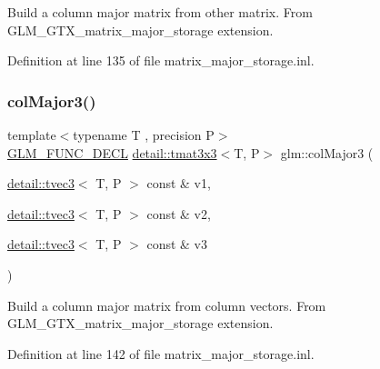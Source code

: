 Build a column major matrix from other matrix. From G\+L\+M\+\_\+\+G\+T\+X\+\_\+matrix\+\_\+major\+\_\+storage extension. 

Definition at line 135 of file matrix\+\_\+major\+\_\+storage.\+inl.

\mbox{\label{group__gtx__matrix__major__storage_ga8bc9dc6fcd7017b7123a151d9f251013}} 
\subsubsection{\texorpdfstring{col\+Major3()}{colMajor3()}\hspace{0.1cm}{\footnotesize\ttfamily [1/2]}}
{\footnotesize\ttfamily template$<$typename T , precision P$>$ \\
\hyperlink{setup_8hpp_ab2d052de21a70539923e9bcbf6e83a51}{G\+L\+M\+\_\+\+F\+U\+N\+C\+\_\+\+D\+E\+CL} \hyperlink{structglm_1_1detail_1_1tmat3x3}{detail\+::tmat3x3}$<$T, P$>$ glm\+::col\+Major3 (\begin{DoxyParamCaption}\item[{\hyperlink{structglm_1_1detail_1_1tvec3}{detail\+::tvec3}$<$ T, P $>$ const \&}]{v1,  }\item[{\hyperlink{structglm_1_1detail_1_1tvec3}{detail\+::tvec3}$<$ T, P $>$ const \&}]{v2,  }\item[{\hyperlink{structglm_1_1detail_1_1tvec3}{detail\+::tvec3}$<$ T, P $>$ const \&}]{v3 }\end{DoxyParamCaption})}

Build a column major matrix from column vectors. From G\+L\+M\+\_\+\+G\+T\+X\+\_\+matrix\+\_\+major\+\_\+storage extension. 

Definition at line 142 of file matrix\+\_\+major\+\_\+storage.\+inl.

\mbox{\label{group__gtx__matrix__major__storage_ga40caccd20b8afb6de68c626efc376927}} 
